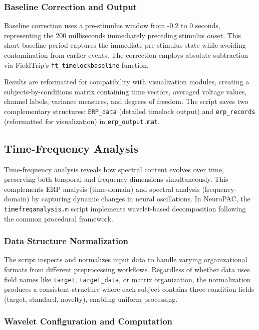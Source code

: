 \documentclass[12pt]{report}
\begin{document}
\subsubsection{Baseline Correction and Output}

Baseline correction uses a pre-stimulus window from -0.2 to 0 seconds, representing the 200 milliseconds immediately preceding stimulus onset. This short baseline period captures the immediate pre-stimulus state while avoiding contamination from earlier events. The correction employs absolute subtraction via FieldTrip's \verb|ft_timelockbaseline| function.

Results are reformatted for compatibility with visualization modules, creating a subjects-by-conditions matrix containing time vectors, averaged voltage values, channel labels, variance measures, and degrees of freedom. The script saves two complementary structures: \verb|ERP_data| (detailed timelock output) and \verb|erp_records| (reformatted for visualization) in \verb|erp_output.mat|.



\subsection{Time-Frequency Analysis}

Time-frequency analysis reveals how spectral content evolves over time, preserving both temporal and frequency dimensions simultaneously. This complements ERP analysis (time-domain) and spectral analysis (frequency-domain) by capturing dynamic changes in neural oscillations. In NeuroPAC, the \verb|timefreqanalysis.m| script implements wavelet-based decomposition following the common procedural framework.

\subsubsection{Data Structure Normalization}

The script inspects and normalizes input data to handle varying organizational formats from different preprocessing workflows. Regardless of whether data uses field names like \verb|target|, \verb|target_data|, or matrix organization, the normalization produces a consistent structure where each subject contains three condition fields (target, standard, novelty), enabling uniform processing.

\subsubsection{Wavelet Configuration and Computation}
\end{document}
